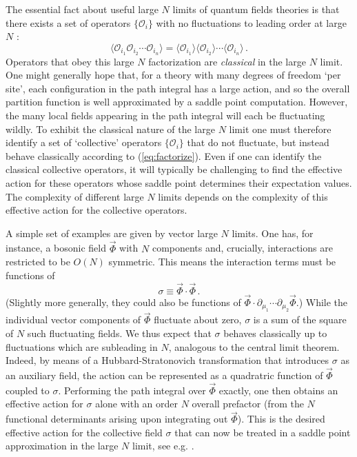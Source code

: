 \documentclass[10pt, oneside]{book}
\def\be{\begin{equation}}
\def\ee{\end{equation}}
\def\ocal{{\mathcal{O}}}
\begin{document}
\begin{doublespace}
The essential fact about useful large $N$ limits of quantum fields theories is that there exists a set of operators $\{\ocal_i\}$ with no fluctuations to leading order at large $N$ \cite{Witten:1979pi, Coleman:1980nk}:
\be\label{eq:factorize}
\langle \ocal_{i_1} \ocal_{i_2} \cdots \ocal_{i_n} \rangle = \langle \ocal_{i_1} \rangle \langle \ocal_{i_2} \rangle \cdots \langle \ocal_{i_n} \rangle \,.
\ee
Operators that obey this large $N$ factorization are {\it classical} in the large $N$ limit. One might generally hope that, for a theory with many degrees of freedom `per site', each configuration in the path integral has a large action, and so the overall partition function is well approximated by a saddle point computation. However, the many local fields appearing in the path integral will each be fluctuating wildly. To exhibit the classical nature of the large $N$ limit one must therefore identify a set of `collective' operators $\{\ocal_i\}$ that do not fluctuate, but instead behave classically according to (\ref{eq:factorize}). Even if one can identify the classical collective operators, it will typically be challenging to find the effective action for these operators whose saddle point determines their expectation values. The complexity of different large $N$ limits depends on the complexity of this effective action for the collective operators.

A simple set of examples are given by vector large $N$ limits. One has, for instance, a bosonic field $\vec \Phi$ with $N$ components and, crucially, interactions are restricted to be $O(N)$ symmetric. This means the interaction terms must be functions of
\be\label{eq:sigma}
\sigma \equiv \vec \Phi \cdot \vec \Phi \,.
\ee
(Slightly more generally, they could also be functions of $\vec \Phi \cdot \partial_{\mu_1} \cdots \partial_{\mu_2} \vec \Phi$.)  While the individual vector components of $\vec\Phi$ fluctuate about zero, $\sigma$ is a sum of the square of $N$ such fluctuating fields.  We thus expect that $\sigma$ behaves classically up to fluctuations which are subleading in $N$, analogous to the central limit theorem.  Indeed, by means of a Hubbard-Stratonovich transformation that introduces $\sigma$ as an auxiliary field, the action can be represented as a quadratric function of $\vec \Phi$ coupled to $\sigma$. Performing the path integral over $\vec \Phi$ exactly, one then obtains an effective action for $\sigma$ alone with an order $N$ overall prefactor (from the $N$ functional determinants arising upon integrating out $\vec \Phi$). This is the desired effective action for the collective field $\sigma$ that can now be treated in a saddle point approximation in the large $N$ limit, see e.g. \cite{ZinnJustin:2002ru}.


\end{doublespace}
\end{document}
